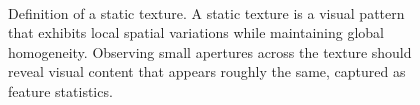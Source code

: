 \begin{figure}[t]
\begin{center}
	\\
	\caption[Definition of a static texture]{Definition of a static texture. A static texture is a visual pattern that exhibits local spatial variations while maintaining global homogeneity. Observing small apertures across the texture should reveal visual content that appears roughly the same, captured as feature statistics.}
	\vspace{-0.65cm}
	\label{fig:texture}
\end{center}
\end{figure}
